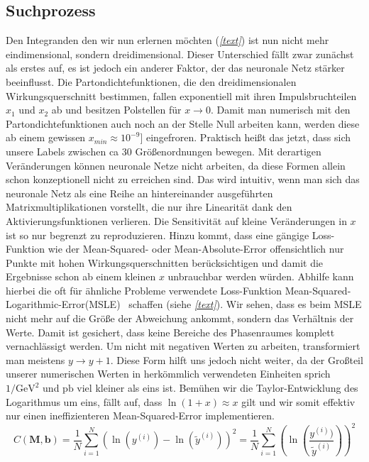 \subsection{Suchprozess}
Den Integranden den wir nun erlernen möchten (\textit{\autoref{text}}) ist nun nicht mehr eindimensional, sondern dreidimensional. Dieser Unterschied fällt zwar zunächst als erstes auf, es ist jedoch ein anderer Faktor, der das neuronale Netz stärker beeinflusst. Die Partondichtefunktionen, die den dreidimensionalen Wirkungsquerschnitt bestimmen, fallen exponentiell mit ihren Impulsbruchteilen $x_1$ und $x_2$ ab und besitzen Polstellen für $x \rightarrow 0$. Damit man numerisch mit den Partondichtefunktionen auch noch an der Stelle Null arbeiten kann, werden diese ab einem gewissen $x_{min} \approx 10^{-9}]$ eingefroren. Praktisch heißt das jetzt, dass sich unsere Labels zwischen ca 30 Größenordnungen bewegen. Mit derartigen Veränderungen können neuronale Netze nicht arbeiten, da diese Formen allein schon konzeptionell nicht zu erreichen sind. Das wird intuitiv, wenn man sich das neuronale Netz als eine Reihe an hintereinander ausgeführten Matrixmultiplikationen vorstellt, die nur ihre Linearität dank den Aktivierungsfunktionen verlieren. Die Sensitivität auf kleine Veränderungen in $x$ ist so nur begrenzt zu reproduzieren. Hinzu kommt, dass eine gängige Loss-Funktion wie der Mean-Squared- oder Mean-Absolute-Error offensichtlich nur Punkte mit hohen Wirkungsquerschnitten berücksichtigen und damit die Ergebnisse schon ab einem kleinen $x$ unbrauchbar werden würden. Abhilfe kann hierbei die oft für ähnliche Probleme verwendete Loss-Funktion \glqq Mean-Squared-Logarithmic-Error(MSLE)\grqq~ schaffen (siehe \textit{\autoref{text}}). Wir sehen, dass es beim MSLE nicht mehr auf die Größe der Abweichung ankommt, sondern das Verhältnis der Werte. Damit ist gesichert, dass keine Bereiche des Phasenraumes komplett vernachlässigt werden. Um nicht mit negativen Werten zu arbeiten, transformiert man meistens $y \rightarrow y + 1$. Diese Form hilft uns jedoch nicht weiter, da der Großteil unserer numerischen Werten in herkömmlich verwendeten Einheiten sprich $1/\text{GeV}^2$ und $\text{pb}$ viel kleiner als eins ist. Bemühen wir die Taylor-Entwicklung des Logarithmus um eins, fällt auf, dass $\ln(1+x) \approx x$ gilt und wir somit effektiv nur einen ineffizienteren Mean-Squared-Error implementieren. 
\begin{equation}
	C\left(\mathbf{M}, \mathbf{b}\right) = \frac{1}{N} \sum_{i=1}^{N} \left(\ln(y^{(i)}) - \ln(\tilde{y}^{(i)})\right)^2 = \frac{1}{N} \sum_{i=1}^{N} \left(\ln(\frac{y^{(i)})}{\tilde{y}^{(i)}})\right)^2
\end{equation}
